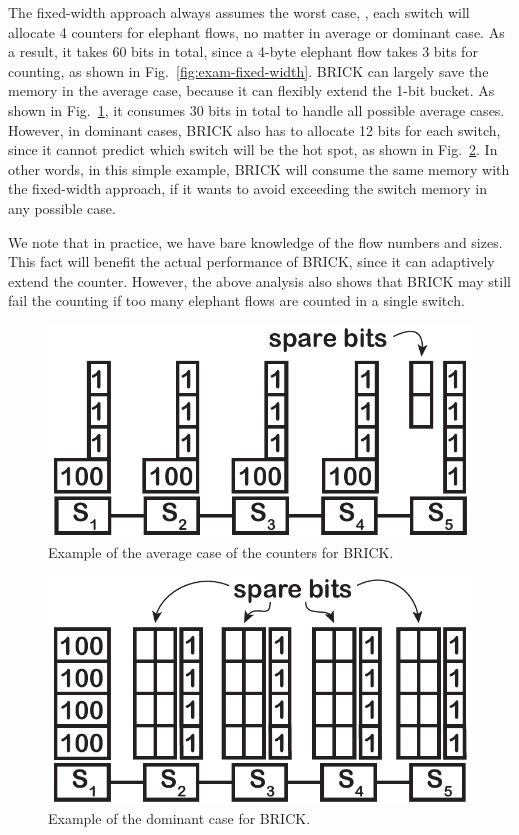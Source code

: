 The fixed-width approach always assumes the worst case, \ie, each switch will allocate 4 counters for elephant flows, no matter in average or dominant case.
As a result, it takes 60 bits in total, since a 4-byte elephant flow takes 3 bits for counting, as shown in Fig.~\ref{fig:exam-fixed-width}.
BRICK can largely save the memory in the average case, because it can flexibly extend the 1-bit bucket.
As shown in Fig.~\ref{fig:exam-brick-avg}, it consumes 30 bits in total to handle all possible average cases.
However, in dominant cases, BRICK also has to allocate 12 bits for each switch, since it cannot predict which switch will be the hot spot, as shown in Fig.~\ref{fig:exam-brick-dmn}.
In other words, in this simple example, BRICK will consume the same memory with the fixed-width approach, if it wants to avoid exceeding the switch memory in any possible case.

We note that in practice, we have bare knowledge of the flow numbers and sizes.
This fact will benefit the actual performance of BRICK, since it can adaptively extend the counter.
However, the above analysis also shows that BRICK may still fail the counting if too many elephant flows are counted in a single switch.

\begin{figure}[t]
    \centering
    \includegraphics[width=0.6\linewidth]{pic/exam-brick-avg.pdf}
    \caption{Example of the average case of the counters for BRICK.
     }
    \label{fig:exam-brick-avg}
\end{figure}

\begin{figure}[t]
    \centering
    \includegraphics[width=0.6\linewidth]{pic/exam-brick-dmn.pdf}
    \caption{Example of the dominant case for BRICK.
     }
    \label{fig:exam-brick-dmn}
\end{figure}


